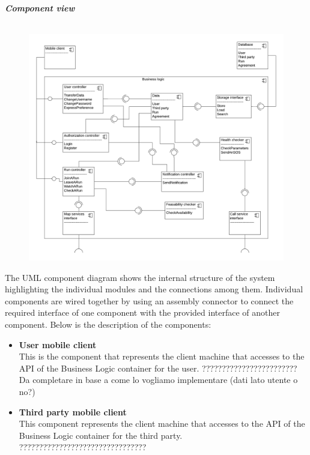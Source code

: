 \begin{legal}
		\item \textit{\textbf{Component view}}\\\\
		\begin{figure}[H]
		\includegraphics[width=\linewidth]{../images/design/ComponentDiagram.png}
		\end{figure}
		The UML component diagram shows the internal structure of the system highlighting the individual modules and the connections among them. Individual components are wired together by using an assembly connector to connect the required interface of one component with the provided interface of another component. Below is the description of the components:\\
		\begin{itemize}
		\item{\textbf{User mobile client}\\
		This is the component that represents the client machine that accesses to the API of the Business Logic container for the user. ???????????????????????? Da completare in base a come lo vogliamo implementare (dati lato utente o no?)
				}\\
		\item{\textbf{Third party mobile client}\\
		This component represents the client machine that accesses to the API of the Business Logic container for the third party. ????????????????????????????????
				}\\

\end{itemize}
\end{legal}
